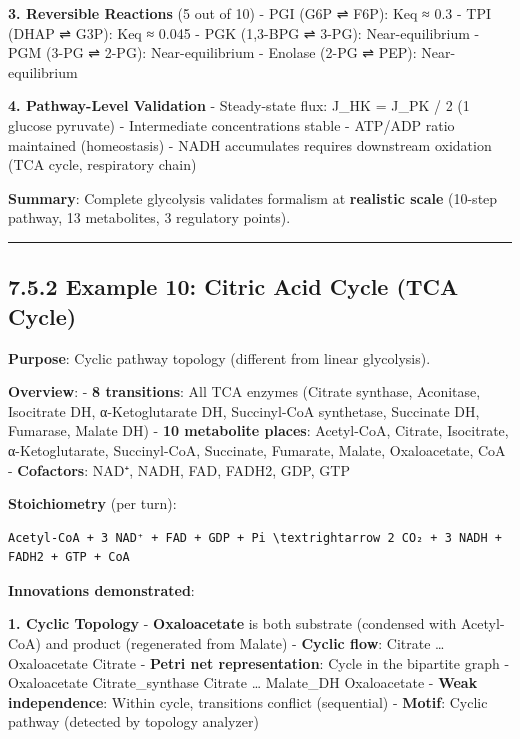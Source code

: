 \textbf{3. Reversible Reactions} (5 out of 10) - PGI (G6P ⇌ F6P): Keq ≈
0.3 - TPI (DHAP ⇌ G3P): Keq ≈ 0.045 - PGK (1,3-BPG ⇌ 3-PG):
Near-equilibrium - PGM (3-PG ⇌ 2-PG): Near-equilibrium - Enolase (2-PG ⇌
PEP): Near-equilibrium

\textbf{4. Pathway-Level Validation} - Steady-state flux: J\_HK = J\_PK
/ 2 (1 glucose  pyruvate) - Intermediate concentrations stable -
ATP/ADP ratio maintained (homeostasis) - NADH accumulates \textrightarrow requires
downstream oxidation (TCA cycle, respiratory chain)

\textbf{Summary}: Complete glycolysis validates formalism at
\textbf{realistic scale} (10-step pathway, 13 metabolites, 3 regulatory
points).

\begin{center}\rule{0.5\linewidth}{0.5pt}\end{center}

\hypertarget{example-10-citric-acid-cycle-tca-cycle}{%
\subsection{7.5.2 Example 10: Citric Acid Cycle (TCA
Cycle)}\label{example-10-citric-acid-cycle-tca-cycle}}

\textbf{Purpose}: Cyclic pathway topology (different from linear
glycolysis).

\textbf{Overview}: - \textbf{8 transitions}: All TCA enzymes (Citrate
synthase, Aconitase, Isocitrate DH, α-Ketoglutarate DH, Succinyl-CoA
synthetase, Succinate DH, Fumarase, Malate DH) - \textbf{10 metabolite
places}: Acetyl-CoA, Citrate, Isocitrate, α-Ketoglutarate, Succinyl-CoA,
Succinate, Fumarate, Malate, Oxaloacetate, CoA - \textbf{Cofactors}:
NAD⁺, NADH, FAD, FADH2, GDP, GTP

\textbf{Stoichiometry} (per turn):

\begin{lstlisting}
Acetyl-CoA + 3 NAD⁺ + FAD + GDP + Pi \textrightarrow 2 CO₂ + 3 NADH + FADH2 + GTP + CoA
\end{lstlisting}

\textbf{Innovations demonstrated}:

\textbf{1. Cyclic Topology} \checkmark - \textbf{Oxaloacetate} is both substrate
(condensed with Acetyl-CoA) and product (regenerated from Malate) -
\textbf{Cyclic flow}: Citrate \textrightarrow \ldots{} \textrightarrow Oxaloacetate \textrightarrow Citrate -
\textbf{Petri net representation}: Cycle in the bipartite graph -
Oxaloacetate \textrightarrow Citrate\_synthase \textrightarrow Citrate \textrightarrow \ldots{} \textrightarrow Malate\_DH \textrightarrow
Oxaloacetate - \textbf{Weak independence}: Within cycle, transitions
conflict (sequential) - \textbf{Motif}: Cyclic pathway (detected by
topology analyzer)

